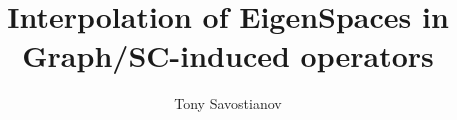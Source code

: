 \documentclass{mynotes}
\title{Interpolation of EigenSpaces in Graph/SC-induced operators}
\author[1]{ Tony Savostianov }
\affil[1]{ RWTH Aachen   \\ email: \email{anton.savostianov@gssi.it} }
\begin{document}
\maketitle





\nocite{*}


\end{document}
